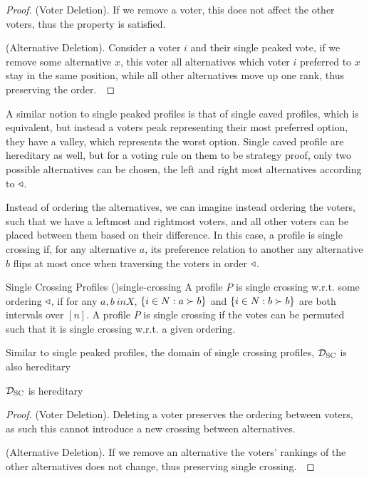 \begin{proof}
	(Voter Deletion). If we remove a voter, this does not affect the other voters, thus the property is satisfied.~\checkmark

	(Alternative Deletion). Consider a voter $i$ and their single peaked vote, if we remove some alternative $x$, this voter all alternatives which voter $i$ preferred to $x$ stay in the same position, while all other alternatives move up one rank, thus preserving the order.~\checkmark
\end{proof}

A similar notion to single peaked profiles is that of single caved profiles, which is equivalent, but instead a voters peak representing their most preferred option, they have a valley, which represents the worst option. Single caved profile are hereditary as well, but for a voting rule on them to be strategy proof, only two possible alternatives can be chosen, the left and right most alternatives according to $\triangleleft$.

Instead of ordering the alternatives, we can imagine instead ordering the voters, such that we have a leftmost and rightmost voters, and all other voters can be placed between them based on their difference. In this case, a profile is single crossing if, for any alternative $a$, its preference relation to another any alternative $b$ flips at most once when traversing the voters in order $\triangleleft$.

\begin{definition}{Single Crossing Profiles \textnormal{(\citet{elkindPreferenceRestrictionsComputational2022a})}}{single-crossing}
	A profile $P$ is single crossing w.r.t. some ordering $\triangleleft$, if for any $a,b \ in X$, $\{i \in N : a \succ b\}$ and $\{i \in N: b \succ b\}$ are both intervals over $[n]$. A profile $P$ is single crossing if the votes can be permuted such that it is single crossing w.r.t. a given ordering.
\end{definition}

Similar to single peaked profiles, the domain of single crossing profiles, $\mathcal{D}_{\textnormal{SC}}$ is also hereditary

\begin{proposition}
	$\mathcal{D}_{\textnormal{SC}}$ is hereditary
\end{proposition}

\begin{proof}
	(Voter Deletion). Deleting a voter preserves the ordering between voters, as such this cannot introduce a new crossing between alternatives.~\checkmark

	(Alternative Deletion). If we remove an alternative the voters' rankings of the other alternatives does not change, thus preserving single crossing.~\checkmark
\end{proof}

